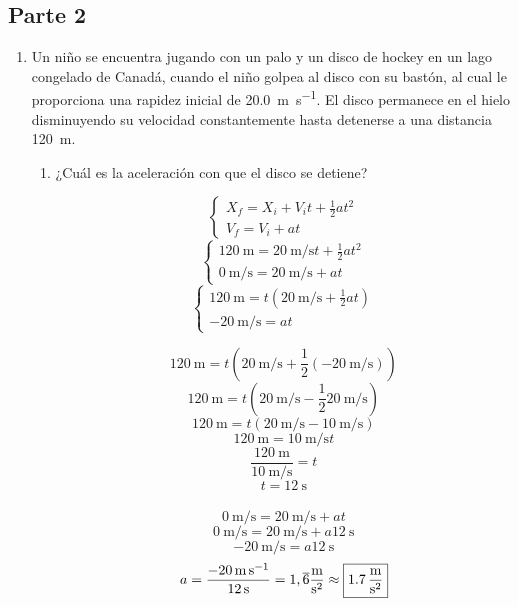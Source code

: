 \documentclass[../practica.root.tex]{subfiles}
\begin{document}
\subsection{Parte 2}
\begin{enumerate}
	\item Un niño se encuentra jugando con un palo y un disco de hockey en un lago congelado de
	      Canadá, cuando el niño golpea al disco con su bastón, al cual le proporciona una rapidez
	      inicial de \SI{20,0}{\meter\per\second}. El disco permanece en el hielo disminuyendo su velocidad
	      constantemente hasta detenerse a una distancia \SI{120}{\meter}.
	      \begin{enumerate}
		      \item ¿Cuál es la aceleración con que el disco se detiene?

		            \[
			            \begin{cases}
				            X_f = X_i + V_it + \frac{1}{2}at^2
				            \\
				            V_f = V_i + at
			            \end{cases}
		            \]\[
			            \begin{cases}
				            \SI{120}{\meter} = \SI{20}{\meter\per\second}t + \frac{1}{2}at^2
				            \\
				            \SI{0}{\meter\per\second} = \SI{20}{\meter\per\second} + at
			            \end{cases}
		            \]\[
			            \begin{cases}
				            \SI{120}{\meter} = t(\SI{20}{\meter\per\second} + \frac{1}{2}at)
				            \\
				            -\SI{20}{\meter\per\second} = at
			            \end{cases}
		            \]

		            \[ \SI{120}{\meter} = t(\SI{20}{\meter\per\second} + \frac{1}{2}(-\SI{20}{\meter\per\second})) \]
		            \[ \SI{120}{\meter} = t(\SI{20}{\meter\per\second} - \frac{1}{2}\SI{20}{\meter\per\second}) \]
		            \[ \SI{120}{\meter} = t(\SI{20}{\meter\per\second} - \SI{10}{\meter\per\second}) \]
		            \[ \SI{120}{\meter} = \SI{10}{\meter\per\second}t \]
		            \[ \frac{\SI{120}{\meter}}{\SI{10}{\meter\per\second}} = t \]
		            \[ t = \SI{12}{\second} \]
		            \\
		            \[ \SI{0}{\meter\per\second} = \SI{20}{\meter\per\second} + at \]
		            \[ \SI{0}{\meter\per\second} = \SI{20}{\meter\per\second} + a\SI{12}{\second} \]
		            \[ -\SI{20}{\meter\per\second} = a\SI{12}{\second} \]
		            \[ a
			            = \frac{-\SI{20}{\meter\per\second}}{\SI{12}{\second}}
			            = 1,\overline{6}\si[per-mode=fraction]{\meter\per\second\squared}
			            \approx \boxed{\SI[per-mode=fraction]{1,7}{\meter\per\second\squared}}
		            \]


\end{enumerate}
\end{enumerate}
\end{document}
